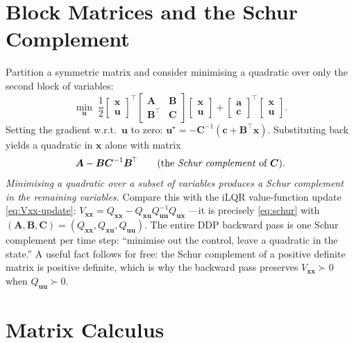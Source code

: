 \documentclass[11pt,twoside]{report}
\theoremstyle{definition}
\theoremstyle{plain}
\theoremstyle{remark}
\newcommand{\x}{\bm{x}}
\newcommand{\uu}{\bm{u}}
\newcommand{\0}{\bm{0}}
\begin{document}
\section{Block Matrices and the Schur Complement}
\label{sec:schur}

Partition a symmetric matrix and consider minimising a quadratic over
only the second block of variables:
\begin{equation}
\min_{\bm{u}}\;
\frac12
\begin{bmatrix}\bm{x}\\\bm{u}\end{bmatrix}^{\!\top}
\begin{bmatrix}\bm{A}&\bm{B}\\\bm{B}^{\!\top}&\bm{C}\end{bmatrix}
\begin{bmatrix}\bm{x}\\\bm{u}\end{bmatrix}
+
\begin{bmatrix}\bm{a}\\\bm{c}\end{bmatrix}^{\!\top}
\begin{bmatrix}\bm{x}\\\bm{u}\end{bmatrix}.
\end{equation}
Setting the gradient w.r.t.\ $\bm{u}$ to zero:
$\bm{u}^{\star}=-\bm{C}^{-1}(\bm{c}+\bm{B}^{\!\top}\bm{x})$.
Substituting back yields a quadratic in $\bm{x}$ alone with matrix
\begin{equation}\label{eq:schur}
\bm{A}-\bm{B}\bm{C}^{-1}\bm{B}^{\!\top}
\qquad\text{(the \emph{Schur complement} of }\bm{C}\text{)}.
\end{equation}
\emph{Minimising a quadratic over a subset of variables produces a
Schur complement in the remaining variables.}
Compare this with the iLQR value-function update
\eqref{eq:Vxx-update}:
$V_{\x\x}=Q_{\x\x}-Q_{\x\uu}Q_{\uu\uu}^{-1}Q_{\uu\x}$
---it is precisely \eqref{eq:schur} with
$(\bm{A},\bm{B},\bm{C})=(Q_{\x\x},Q_{\x\uu},Q_{\uu\uu})$.
The entire DDP backward pass is one Schur complement per time step:
``minimise out the control, leave a quadratic in the state.''
A useful fact follows for free: the Schur complement of a positive
definite matrix is positive definite, which is why the backward pass
preserves $V_{\x\x}\succ 0$ when $Q_{\uu\uu}\succ 0$.

\section{Matrix Calculus}
\end{document}
